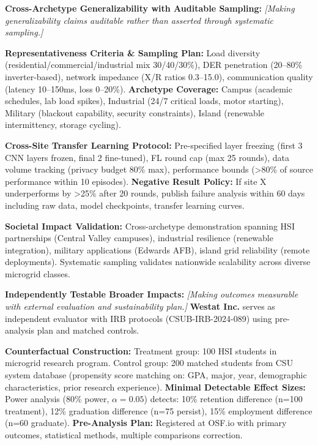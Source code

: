 \documentclass[12pt]{article}
\begin{document}
\textbf{Cross-Archetype Generalizability with Auditable Sampling:} \textit{[Making generalizability claims auditable rather than asserted through systematic sampling.]} 

\textbf{Representativeness Criteria \& Sampling Plan:} Load diversity (residential/commercial/industrial mix 30/40/30\%), DER penetration (20--80\% inverter-based), network impedance (X/R ratios 0.3--15.0), communication quality (latency 10--150ms, loss 0--20\%). \textbf{Archetype Coverage:} Campus (academic schedules, lab load spikes), Industrial (24/7 critical loads, motor starting), Military (blackout capability, security constraints), Island (renewable intermittency, storage cycling).

\textbf{Cross-Site Transfer Learning Protocol:} Pre-specified layer freezing (first 3 CNN layers frozen, final 2 fine-tuned), FL round cap (max 25 rounds), data volume tracking (privacy budget 80\% max), performance bounds (>80\% of source performance within 10 episodes). \textbf{Negative Result Policy:} If site X underperforms by >25\% after 20 rounds, publish failure analysis within 60 days including raw data, model checkpoints, transfer learning curves.

\textbf{Societal Impact Validation:} Cross-archetype demonstration spanning HSI partnerships (Central Valley campuses), industrial resilience (renewable integration), military applications (Edwards AFB), island grid reliability (remote deployments). Systematic sampling validates nationwide scalability across diverse microgrid classes.

\textbf{Independently Testable Broader Impacts:} \textit{[Making outcomes measurable with external evaluation and sustainability plan.]} \textbf{Westat Inc.} serves as independent evaluator with IRB protocols (CSUB-IRB-2024-089) using pre-analysis plan and matched controls.

\textbf{Counterfactual Construction:} Treatment group: 100 HSI students in microgrid research program. Control group: 200 matched students from CSU system database (propensity score matching on: GPA, major, year, demographic characteristics, prior research experience). \textbf{Minimal Detectable Effect Sizes:} Power analysis (80\% power, $\alpha=0.05$) detects: 10\% retention difference (n=100 treatment), 12\% graduation difference (n=75 persist), 15\% employment difference (n=60 graduate). \textbf{Pre-Analysis Plan:} Registered at OSF.io with primary outcomes, statistical methods, multiple comparisons correction.
\end{document}
